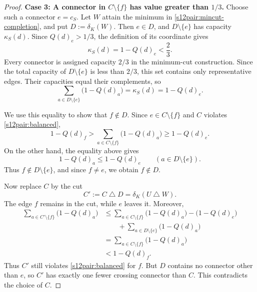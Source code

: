 \documentclass[11pt]{amsart}
\newcommand{\1}{\mathbbm{1}}
\begin{document}
\begin{proof}
\smallskip\noindent
\textbf{Case 3: A connector in $C\setminus\{f\}$ has value
greater than $1/3$.}
Choose such a connector $e=c_S$. Let $W$ attain the minimum
in \eqref{s12pair:mincut-completion}, and put $D:=\delta_K(W)$.
Then $e\in D$, and $D\setminus\{e\}$ has capacity $\kappa_S(d)$.
Since ${Q(d)}_e>1/3$, the definition of its coordinate gives
\[
 \kappa_S(d)=1-{Q(d)}_e<\frac23.
\]
Every connector is assigned capacity $2/3$ in the minimum-cut
construction. Since the total capacity of $D\setminus\{e\}$
is less than $2/3$, this set contains only representative
edges. Their capacities equal their complements, so
\[
 \sum_{a\in D\setminus\{e\}}\bigl(1-{Q(d)}_a\bigr)
 =\kappa_S(d)=1-{Q(d)}_e.
\]

We use this equality to show that $f\notin D$.
Since $e\in C\setminus\{f\}$ and $C$ violates
\eqref{s12pair:balanced},
\[
 1-{Q(d)}_f
 >\sum_{a\in C\setminus\{f\}}\bigl(1-{Q(d)}_a\bigr)
 \ge1-{Q(d)}_e.
\]
On the other hand, the equality above gives
\[
 1-{Q(d)}_a\le1-{Q(d)}_e
 \qquad(a\in D\setminus\{e\}).
\]
Thus $f\notin D\setminus\{e\}$, and since $f\ne e$,
we obtain $f\notin D$.

Now replace $C$ by the cut
\[
 C':=C\mathbin{\triangle}D
    =\delta_K(U\mathbin{\triangle}W).
\]
The edge $f$ remains in the cut, while $e$ leaves it. Moreover,
\[
 \begin{aligned}
 \sum_{a\in C'\setminus\{f\}}\bigl(1-{Q(d)}_a\bigr)
 &\le\sum_{a\in C\setminus\{f\}}\bigl(1-{Q(d)}_a\bigr)
       -\bigl(1-{Q(d)}_e\bigr)\\
 &\qquad+\sum_{a\in D\setminus\{e\}}\bigl(1-{Q(d)}_a\bigr)\\
 &=\sum_{a\in C\setminus\{f\}}\bigl(1-{Q(d)}_a\bigr)\\
 &<1-{Q(d)}_f.
 \end{aligned}
\]
Thus $C'$ still violates \eqref{s12pair:balanced} for $f$.
But $D$ contains no connector other than $e$, so $C'$ has
exactly one fewer crossing connector than $C$. This contradicts
the choice of $C$.


\end{proof}
\end{document}
